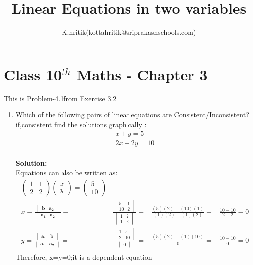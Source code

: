 \documentclass[12pt]{article}
\title{Linear Equations in two variables }
\author{K.hritik(kottahritik@sriprakashschools.com)}
\newcommand{\myvec}[1]{\ensuremath{\begin{pmatrix}#1\end{pmatrix}}}
\newcommand{\mydet}[1]{\ensuremath{\begin{vmatrix}#1\end{vmatrix}}}
\newcommand{\solution}{\noindent \textbf{Solution: }}
\let\vec\mathbf
\begin{document}
\maketitle
\section*{Class 10$^{th}$ Maths - Chapter 3}
This is Problem-4.1from Exercise 3.2
\begin{enumerate}
\item Which of the following pairs of linear equations are Consistent/Inconsistent?if,consistent find the solutions graphically :\\
\begin{align}
    x+y=5\\
         2x+2y=10 \\ 
\end{align}
      
\solution \\
            Equations  can also be written as:\\     
\begin{align}
\myvec{1&1\\2&2}\myvec{x\\y} = \myvec{5\\10}\\
x=\frac{\mydet{ \vec{b} & \vec{a_2}}}{\mydet{ \vec{a_1} &\vec{a_2} }} =&
\frac{\mydet{ 5 & 1 \\ 10 & 2 }}{\mydet{1&2\\1&2}} =&
\frac{(5)(2)-(10)(1)}{(1)(2)-(1)(2)} =&
\frac{10-10}{2-2} = 0 \\
y=\frac{\mydet{\vec{a_1}&\vec{b}}}{\mydet{\vec{a_1}&\vec{a_2}}} =&
\frac{\mydet{1&5\\2&10}}{\mydet{0}} =&
\frac{(5)(2)-(1)(10)}{0} =&
\frac{10-10}{0} = 0\\
\end{align}
Therefore, x=y=0;it is a dependent equation

	

\end{enumerate}
\end{document}
